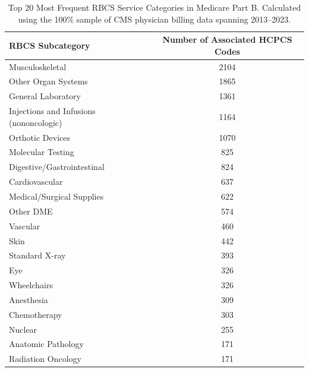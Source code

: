 \begin{table}[htbp]
\caption{Top 20 Most Frequent RBCS Service Categories in Medicare Part B. Calculated using the 100\% sample of CMS physician billing data spanning 2013--2023.}
\label{tab:rbcs}
\begin{tabular}{lc}
\toprule
\rowcolor{gray!10}
RBCS Subcategory & Number of Associated HCPCS Codes \\
\midrule
Musculoskeletal & 2104 \\
Other Organ Systems & 1865 \\
General Laboratory & 1361 \\
Injections and Infusions (nononcologic) & 1164 \\
Orthotic Devices & 1070 \\
Molecular Testing & 825 \\
Digestive/Gastrointestinal & 824 \\
Cardiovascular & 637 \\
Medical/Surgical Supplies & 622 \\
Other DME & 574 \\
Vascular & 460 \\
Skin & 442 \\
Standard X-ray & 393 \\
Eye & 326 \\
Wheelchairs & 326 \\
Anesthesia & 309 \\
Chemotherapy & 303 \\
Nuclear & 255 \\
Anatomic Pathology & 171 \\
Radiation Oncology & 171 \\
\bottomrule
\end{tabular}
\end{table}
